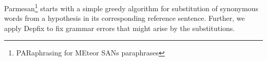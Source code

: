 \documentclass[11pt]{article}
\begin{document}
%
%
%
%
%

Parmesan\footnote{PARaphrasing for MEteor SANs paraphrases} starts with a simple greedy algorithm for 
substitution of synonymous words from a hypothesis in its corresponding reference sentence. Further, 
we apply Depfix \cite{depfix} to fix grammar errors that might arise by the substitutions.
\end{document}
